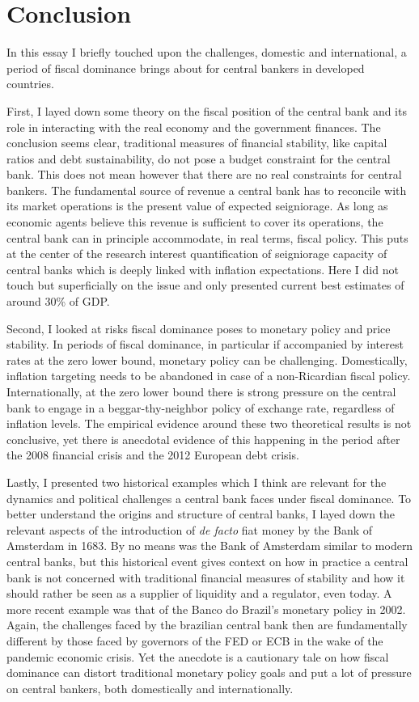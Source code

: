 \documentclass[american]{scrartcl}
\begin{document}
\section{Conclusion}

In this essay I briefly touched upon the challenges, domestic and international, a period of fiscal dominance brings about for central bankers in developed countries.

First, I layed down some theory on the fiscal position of the central bank and its role in interacting with the real economy and the government finances. The conclusion seems clear, traditional measures of financial stability, like capital ratios and debt sustainability, do not pose a budget constraint for the central bank. This does not mean however that there are no real constraints for central bankers. The fundamental source of revenue a central bank has to reconcile with its market operations is the present value of expected seigniorage. As long as economic agents believe this revenue is sufficient to cover its operations, the central bank can in principle accommodate, in real terms, fiscal policy. This puts at the center of the research interest quantification of seigniorage capacity of central banks which is deeply linked with inflation expectations. Here I did not touch but superficially on the issue and only presented current best estimates of around 30\% of GDP.

Second, I looked at risks fiscal dominance poses to monetary policy and price stability. In periods of fiscal dominance, in particular if accompanied by interest rates at the zero lower bound, monetary policy can be challenging. Domestically, inflation targeting needs to be abandoned in case of a non-Ricardian fiscal policy. Internationally, at the zero lower bound there is strong pressure on the central bank to engage in a beggar-thy-neighbor policy of exchange rate, regardless of inflation levels. The empirical evidence around these two theoretical results is not conclusive, yet there is anecdotal evidence of this happening in the period after the 2008 financial crisis and the 2012 European debt crisis.

Lastly, I presented two historical examples which I think are relevant for the dynamics and political challenges a central bank faces under fiscal dominance. To better understand the origins and structure of central banks, I layed down the relevant aspects of the introduction of \textit{de facto} fiat money by the Bank of Amsterdam in 1683. By no means was the Bank of Amsterdam similar to modern central banks, but this historical event gives context on how in practice a central bank is not concerned with traditional financial measures of stability and how it should rather be seen as a supplier of liquidity and a regulator, even today. A more recent example was that of the Banco do Brazil's monetary policy in 2002. Again, the challenges faced by the brazilian central bank then are fundamentally different by those faced by governors of the FED or ECB in the wake of the pandemic economic crisis. Yet the anecdote is a cautionary tale on how fiscal dominance can distort traditional monetary policy goals and put a lot of pressure on central bankers, both domestically and internationally.
\end{document}
